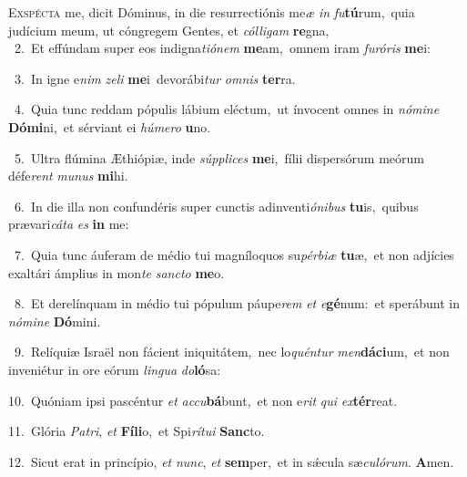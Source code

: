 \lettrine{\initial\textcolor{\initialcolor}{E}}{xspécta} me, dicit Dóminus, in die resurrectiónis me\textit{æ} \textit{in} \textit{fu}\-\textbf{tú}rum,~\star quia judícium meum, ut cóngregem Gentes, et \textit{cól}\-\textit{li}\textit{gam} \textbf{re}\-gna,\\
{\numbfont\textcolor{\numbcolor}{~2.}}~Et effúndam super eos indigna\-\textit{ti}\-\textit{ó}\textit{nem} \textbf{me}\-am,~\star omnem iram \textit{fu}\-\textit{ró}\textit{ris} \textbf{me}\-i:\par
{\numbfont\textcolor{\numbcolor}{~3.}}~In igne e\textit{nim} \textit{ze}\-\textit{li} \textbf{me}\-i~\star devorábi\textit{tur} \textit{om}\-\textit{nis} \textbf{ter}\-ra.\par
{\numbfont\textcolor{\numbcolor}{~4.}}~Quia tunc reddam pópulis lábium eléctum,~\dagger ut ínvocent omnes in \textit{nó}\-\textit{mi}\textit{ne} \textbf{Dó}\-\textbf{mi}ni,~\star et sérviant ei \textit{hú}\-\textit{me}\textit{ro} \textbf{u}\-no.\par
{\numbfont\textcolor{\numbcolor}{~5.}}~Ultra flúmina Æthiópiæ, inde \textit{súp}\-\textit{pli}\textit{ces} \textbf{me}\-i,~\star fílii dispersórum meórum défe\textit{rent} \textit{mu}\-\textit{nus} \textbf{mi}\-hi.\par
{\numbfont\textcolor{\numbcolor}{~6.}}~In die illa non confundéris super cunctis adinventi\-\textit{ó}\-\textit{ni}\textit{bus} \textbf{tu}\-is,~\star quibus prævari\-\textit{cá}\-\textit{ta} \textit{es} \textbf{in} me:\par
{\numbfont\textcolor{\numbcolor}{~7.}}~Quia tunc áuferam de médio tui magníloquos su\-\textit{pér}\-\textit{bi}\textit{æ} \textbf{tu}\-æ,~\star et non adjícies exaltári ámplius in mon\textit{te} \textit{sanc}\-\textit{to} \textbf{me}\-o.\par
{\numbfont\textcolor{\numbcolor}{~8.}}~Et derelínquam in médio tui pópulum páupe\textit{rem} \textit{et} \textit{e}\-\textbf{gé}num:~\star et sperábunt in \textit{nó}\-\textit{mi}\textit{ne} \textbf{Dó}\-mini.\par
{\numbfont\textcolor{\numbcolor}{~9.}}~Relíquiæ Israël non fácient iniquitátem,~\dagger nec lo\-\textit{quén}\-\textit{tur} \textit{men}\-\textbf{dá}\textbf{ci}um,~\star et non inveniétur in ore eórum \textit{lin}\-\textit{gua} \textit{do}\-\textbf{ló}sa:\par
{\numbfont\textcolor{\numbcolor}{10.}}~Quóniam ipsi pascéntur \textit{et} \textit{ac}\-\textit{cu}\textbf{bá}bunt,~\star et non e\textit{rit} \textit{qui} \textit{ex}\-\textbf{tér}reat.\par
{\numbfont\textcolor{\numbcolor}{11.}}~Glória \textit{Pa}\-\textit{tri}, \textit{et} \textbf{Fí}\-\textbf{li}o,~\star et Spi\-\textit{rí}\-\textit{tu}\textit{i} \textbf{Sanc}\-to.\par
{\numbfont\textcolor{\numbcolor}{12.}}~Sicut erat in princípio, \textit{et} \textit{nunc}\-, \textit{et} \textbf{sem}\-per,~\star et in sǽcula sæ\-\textit{cu}\-\textit{ló}\textit{rum}. \textbf{A}\-men.\par
